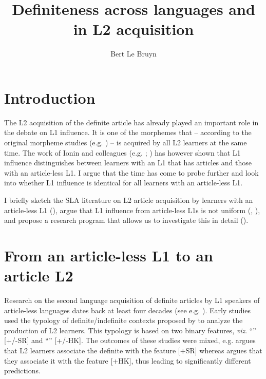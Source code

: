 \documentclass[output=paper,
modfonts
]{langscibook}
\title{Definiteness across languages and in L2 acquisition}
\author{%
Bert Le Bruyn\affiliation{Utrecht Institute of Linguistics OTS}
}
\begin{document}
\maketitle

\section{Introduction}
The L2 acquisition of the definite article has already played an important role in the debate on L1 influence. It is one of the morphemes that -- according to the original morpheme studies (e.g. \citealt{DulayBurt1974}) -- is acquired by all L2 learners at the same time. The work of Ionin and colleagues (e.g. \citealt{IoninKoWexler2004}; \citealt{IoninMontrul2010}) has however shown that L1 influence distinguishes between learners with an L1 that has articles and those with an article-less L1. I argue that the time has come to probe further and look into whether L1 influence is identical for all learners with an article-less L1. 

I briefly sketch the SLA literature on L2 article acquisition by learners with an article-less L1 (), argue that L1 influence from article-less L1s is not uniform \largerpage (, ), and propose a research program that allows us to investigate this in detail ().

\section{From an article-less L1 to an article L2}\label{sec:lebruyn:2}

Research on the second language acquisition of definite articles by L1 speakers of article-less languages dates back at least four decades (see e.g. \citealt{Hakuta1976}). Early studies \citep{Huebner1983,TaroneParrish1988,Thomas1989} used the typology of definite/indefinite contexts proposed by \citet{Bickerton1981} to analyze the production of L2 learners. This typology is based on two binary features, \textit{viz}. ``'' [+/-SR] and ``'' [+/-HK]. The outcomes of these studies were mixed, e.g. \citet{Thomas1989} argues that L2 learners associate the definite with the feature [+SR] whereas \citet{Master1987} argues that they associate it with the feature [+HK], thus leading to significantly different predictions.
\end{document}
